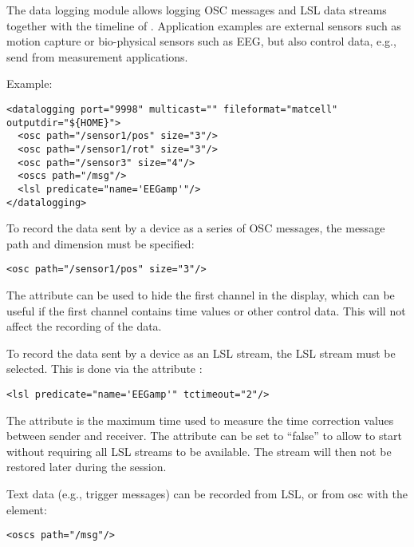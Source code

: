 The data logging module allows logging OSC messages and LSL data streams
together with the timeline of \tascar{}.
%
Application examples are external sensors such as motion capture or
bio-physical sensors such as EEG, but also control data, e.g., send from
measurement applications.

Example:
\begin{lstlisting}[numbers=none]
<datalogging port="9998" multicast="" fileformat="matcell" outputdir="${HOME}">
  <osc path="/sensor1/pos" size="3"/>
  <osc path="/sensor1/rot" size="3"/>
  <osc path="/sensor3" size="4"/>
  <oscs path="/msg"/>
  <lsl predicate="name='EEGamp'"/>
</datalogging>
\end{lstlisting}

To record the data sent by a device as a series of OSC messages, the
message path  and dimension  must be specified:
%
\begin{lstlisting}[numbers=none]
  <osc path="/sensor1/pos" size="3"/>
\end{lstlisting}
%
The  attribute can be used to hide the first channel
in the display, which can be useful if the first channel contains time
values or other control data. This will not affect the recording of the
data.

To record the data sent by a device as an LSL stream, the LSL stream
must be selected. This is done via the attribute :
\begin{lstlisting}[numbers=none]
  <lsl predicate="name='EEGamp'" tctimeout="2"/>
\end{lstlisting}
The  attribute is the maximum time used to measure the
time correction values between sender and receiver. The 
attribute can be set to ``false'' to allow \tascar{} to start without
requiring all LSL streams to be available. The stream will then not be
restored later during the session.

Text data (e.g., trigger messages) can be recorded from LSL, or from osc
with the  element:
\begin{lstlisting}[numbers=none]
  <oscs path="/msg"/>
\end{lstlisting}


